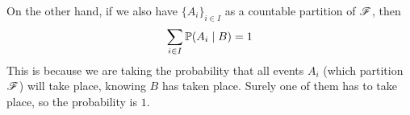 \documentclass[12pt]{article}
\begin{document}
    On the other hand, if we also have 
    $\{A_i\}_{i \in I}$
    as a countable partition of $\mathscr{F}$,
    then
    \[ \sum_{i \in I}\mathbb{P}(A_i \mid B)
    = 1 \]
    This is because we are taking
    the probability that all events
    $A_i$ (which partition $\mathscr{F}$)
    will take place, knowing $B$
    has taken place.
    Surely one of them has to take place,
    so the probability is $1$. \\
\end{document}
